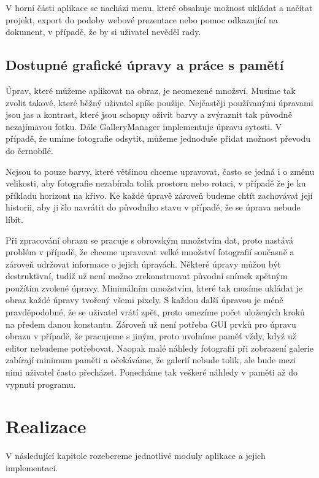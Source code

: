 \documentclass[11pt,twoside,a4paper]{book}
\begin{document}
\indent
V horní části aplikace se nachází menu, které obsahuje možnost ukládat a načítat projekt, export do podoby webové prezentace nebo pomoc odkazující na dokument, v případě, že by si uživatel nevěděl rady.

\section{Dostupné grafické úpravy a práce s pamětí}
\noindent
Úprav, které můžeme aplikovat na obraz, je neomezené množsví. Musíme tak zvolit takové, které běžný uživatel spíše použije. Nejčastěji používanými úpravami jsou jas a kontrast, které jsou schopny oživit barvy a zvýraznit tak původně nezajímavou fotku. Dále GalleryManager implementuje úpravu sytosti. V případě, že umíme fotografie odsytit, můžeme jednoduše přidat možnost převodu do černobílé.

\indent
Nejsou to pouze barvy, které většinou chceme upravovat, často se jedná i o změnu velikosti, aby fotografie nezabírala tolik prostoru nebo rotaci, v případě že je ku příkladu horizont na křivo. Ke každé úpravě zároveň budeme chtít zachovávat její historii, aby ji šlo navrátit do původního stavu v případě, že se úprava nebude líbit.

\indent
Při zpracování obrazu se pracuje s obrovským množstvím dat, proto nastává problém v případě, že chceme upravovat velké množství fotografií současně a zároveň udržovat informace o jejich úpravách. Některé úpravy můžou být destruktivní, tudíž už není možno zrekonstruovat původní snímek zpětným použítím zvolené úpravy. Minimálním množstvím, které tak musíme ukládat je obraz každé úpravy tvořený všemi pixely. S každou další úpravou je méně pravděpodobné, že se uživatel vrátí zpět, proto omezíme počet uložených kroků na předem danou konstantu. Zároveň už není potřeba GUI prvků pro úpravu obrazu v případě, že pracujeme s jiným, proto uvolníme paměť vždy, když už editor nebudeme potřebovat. Naopak malé náhledy fotografií při zobrazení galerie zabírají minimum paměti a očekáváme, že galerií nebude tolik, ale bude mezi nimi uživatel často přecházet. Ponecháme tak veškeré náhledy v paměti až do vypnutí programu.

\chapter{Realizace}
\noindent
V následující kapitole rozebereme jednotlivé moduly aplikace a jejich implementaci.
\end{document}
